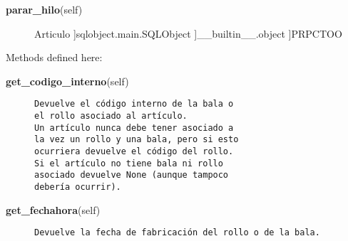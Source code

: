 \begin{description}\item[{\bf parar\_hilo}(self)\end{description}

 \par 


~\\
class {\bf Articulo}(sqlobject.main.SQLObject, PRPCTOO)
    
{\tt ~~~}~
\begin{description}\item[Method resolution order:
]Articulo
]sqlobject.main.SQLObject
]\_\_builtin\_\_.object
]PRPCTOO
\end{description}

Methods defined here:\\
\begin{description}\item[{\bf get\_codigo\_interno}(self)]{\tt Devuelve~el~código~interno~de~la~bala~o~\\
el~rollo~asociado~al~artículo.\\
Un~artículo~nunca~debe~tener~asociado~a~\\
la~vez~un~rollo~y~una~bala,~pero~si~esto\\
ocurriera~devuelve~el~código~del~rollo.\\
Si~el~artículo~no~tiene~bala~ni~rollo~\\
asociado~devuelve~None~(aunque~tampoco~\\
debería~ocurrir).}\end{description}

\begin{description}\item[{\bf get\_fechahora}(self)]{\tt Devuelve~la~fecha~de~fabricación~del~rollo~o~de~la~bala.}\end{description}


